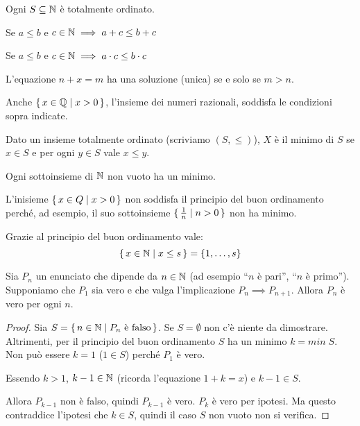 \begin{remark}
Ogni $S \subseteq \mathbb N$ è totalmente ordinato.
\end{remark}

Se $a \le b$ e $c \in \mathbb N \implies a+c \le b+c$

Se $a \le b$ e $c \in \mathbb N \implies a \cdot c \le b \cdot c$ 

L'equazione $n+x=m$ ha una soluzione (unica) se e solo se $m > n$.

Anche $\set{x \in \mathbb Q| x > 0}$, l'insieme dei numeri razionali, soddisfa le condizioni sopra indicate.

\begin{definition}
Dato un insieme totalmente ordinato (scriviamo $(S, \le)$), $X$ è il minimo di $S$ se $x \in S$ e per ogni $y \in S$ vale $x \le y$.
\end{definition}

\begin{proposition}
Ogni sottoinsieme di $\mathbb N$ non vuoto ha un minimo.
\end{proposition}

\begin{example}
L'inisieme $\set{x \in Q | x > 0}$ non soddisfa il principio del buon ordinamento perché, ad esempio, il suo sottoinsieme $\set{\frac{1}{n} | n > 0}$ non ha minimo.
\end{example}

\begin{remark}
Grazie al principio del buon ordinamento vale: 
\begin{equation*}
\set{x \in \mathbb N| x \le s} = \{1, \ldots, s\}
\end{equation*}
\end{remark}

\begin{proposition}
Sia $P_n$ un enunciato che dipende da $n \in \mathbb N$ (ad esempio ``$n$ è pari'', ``$n$ è primo''). Supponiamo che $P_1$ sia vero e che valga l'implicazione $P_n \implies P_{n+1}$. Allora $P_n$ è vero per ogni $n$.
\end{proposition}

\begin{proof}
Sia $S = \set{n \in \mathbb N| P_n \text{ è falso}}$.
Se $S = \emptyset$ non c'è niente da dimostrare.
Altrimenti, per il principio del buon ordinamento $S$ ha un minimo $k = min\; S$. Non può essere $k = 1$ ($1 \in S$) perché $P_1$ è vero.

Essendo $k>1$, $k-1 \in \mathbb N$ (ricorda l'equazione $1+k=x$) e $k-1 \in S$.

Allora $P_{k-1}$ non è falso, quindi $P_{k-1}$ è vero. $P_k$ è vero per ipotesi. Ma questo contraddice l'ipotesi che $k \in S$, quindi il caso $S$ non vuoto non si verifica.
\end{proof}

